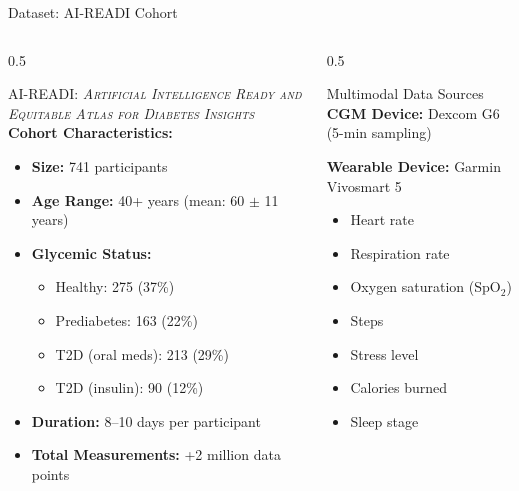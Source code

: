 \documentclass[aspectratio=169,xcolor=dvipsnames]{beamer}
\begin{document}
\begin{frame}{Dataset: AI-READI Cohort}
    \begin{columns}
        \begin{column}{0.5\textwidth}
            \begin{block}{AI-READI: \textsc{\textit{Artificial Intelligence Ready and Equitable Atlas for Diabetes Insights}}}
                \textbf{Cohort Characteristics:}
                \begin{itemize}
                    \item \textbf{Size:} 741 participants
                    \item \textbf{Age Range:} 40+ years (mean: 60 $\pm$ 11 years)
                    \item \textbf{Glycemic Status:}
                    \begin{itemize}
                        \item Healthy: 275 (37\%)
                        \item Prediabetes: 163 (22\%)
                        \item T2D (oral meds): 213 (29\%)
                        \item T2D (insulin): 90 (12\%)
                    \end{itemize}
                    \item \textbf{Duration:} 8--10 days per participant
                    \item \textbf{Total Measurements:} +2 million data points
                \end{itemize}
            \end{block}
        \end{column}
        
        \begin{column}{0.5\textwidth}
            \begin{block}{Multimodal Data Sources}
                \textbf{CGM Device:} Dexcom G6 (5-min sampling)
                
                \vspace{0.05em}
                \textbf{Wearable Device:} Garmin Vivosmart 5
                \begin{itemize}
                    \item Heart rate
                    \item Respiration rate
                    \item Oxygen saturation (SpO$_2$)
                    \item Steps
                    \item Stress level
                    \item Calories burned
                    \item Sleep stage
                \end{itemize}
                

\end{block}
\end{column}
\end{columns}
\end{frame}
\end{document}
